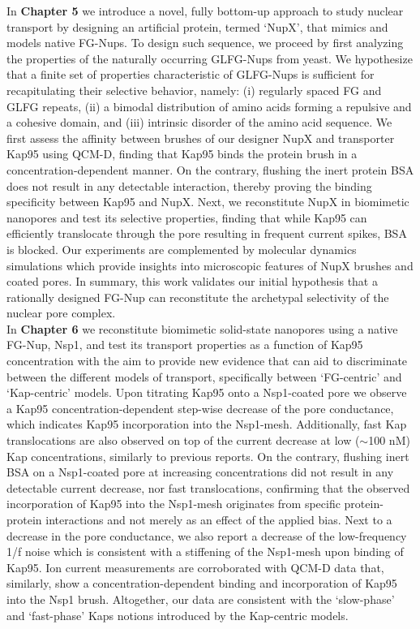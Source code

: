 \noindent In \textbf{Chapter 5} we introduce a novel, fully bottom-up approach to study nuclear transport by designing an artificial protein, termed ‘NupX’, that mimics and models native FG-Nups. To design such sequence, we proceed by first analyzing the properties of the naturally occurring GLFG-Nups from yeast. We hypothesize that a finite set of properties characteristic of GLFG-Nups is sufficient for recapitulating their selective behavior, namely: (i) regularly spaced FG and GLFG repeats, (ii) a bimodal distribution of amino acids forming a repulsive and a cohesive domain, and (iii) intrinsic disorder of the amino acid sequence. We first assess the affinity between brushes of our designer NupX and transporter Kap95 using QCM-D, finding that Kap95 binds the protein brush in a concen\-tration-dependent manner. On the contrary, flushing the inert protein BSA does not result in any detectable interaction, thereby proving the binding specificity between Kap95 and NupX. Next, we reconstitute NupX in biomimetic nanopores and test its selective properties, finding that while Kap95 can efficiently translocate through the pore resulting in frequent current spikes, BSA is blocked. Our experiments are complemented by molecular dynamics simulations which provide insights into microscopic features of NupX brushes and coated pores. In summary, this work validates our initial hypothesis that a rationally designed FG-Nup can reconstitute the archetypal selectivity of the nuclear pore complex.
\\[0.5pt]

\noindent In \textbf{Chapter 6} we reconstitute biomimetic solid-state nanopores using a native FG-Nup, Nsp1, and test its transport properties as a function of Kap95 concentration with the aim to provide new evidence that can aid to discriminate between the different models of transport, specifically between ‘FG-centric’ and ‘Kap-centric’ models. Upon titrating Kap95 onto a Nsp1-coated pore we observe a Kap95 concentration-dependent step-wise decrease of the pore conductance, which indicates Kap95 incorporation into the Nsp1-mesh. Additionally, fast Kap translocations are also observed on top of the current decrease at low ($\sim$100 nM) Kap concentrations, similarly to previous reports. On the contrary, flushing inert BSA on a Nsp1-coated pore at increasing concentrations did not result in any detectable current decrease, nor fast translocations, confirming that the observed incorporation of Kap95 into the Nsp1-mesh originates from specific protein-protein interactions and not merely as an effect of the applied bias. Next to a decrease in the pore conductance, we also report a decrease of the low-frequency 1/f noise which is consistent with a stiffening of the Nsp1-mesh upon binding of Kap95. Ion current measurements are corroborated with QCM-D data that, similarly, show a concentration-dependent binding and incorporation of Kap95 into the Nsp1 brush. Altogether, our data are consistent with the ‘slow-phase’ and ‘fast-phase’ Kaps notions introduced by the Kap-centric models.
\\[0.1cm]

